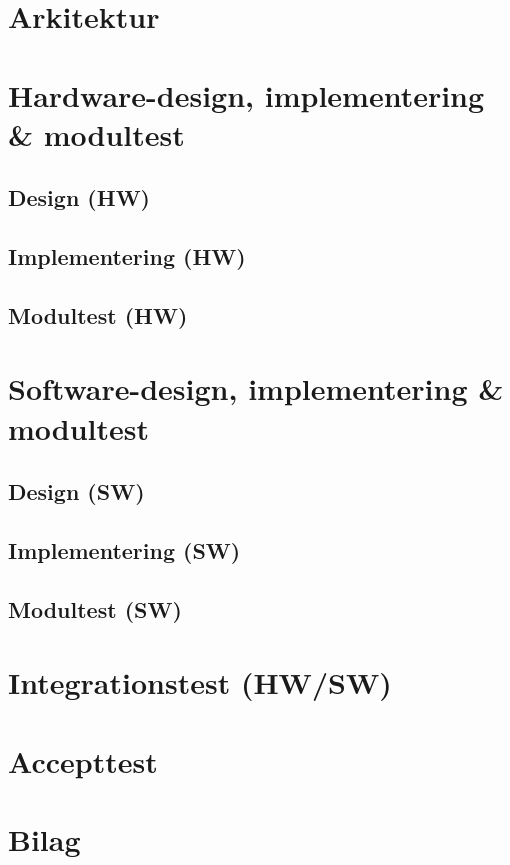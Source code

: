 \documentclass[11pt]{article}
\begin{document}
\section{Arkitektur}
\vfill
\pagebreak

\section{Hardware-design, implementering \& modultest}
\subsection{Design (HW)}
\subsection{Implementering (HW)}
\subsection{Modultest (HW)}
\vfill
\pagebreak

\section{Software-design, implementering \& modultest}
\subsection{Design (SW)}
\subsection{Implementering (SW)}
\subsection{Modultest (SW)}
\vfill
\pagebreak

\section{Integrationstest (HW/SW)}
\vfill
\pagebreak

\section{Accepttest}
\vfill
\pagebreak

\section{Bilag}
\vfill
\pagebreak
\end{document}
